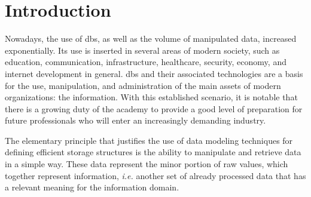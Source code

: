 \chapter{Introduction}
\label{chap:introduction}

Nowadays, the use of \acp{db}, as well as the volume of manipulated data, increased exponentially.
Its use is inserted in several areas of modern society, such as education, communication, infrastructure, healthcare, security, economy, and internet development in general.
\acp{db} and their associated technologies are a basis for the use, manipulation, and administration of the main assets of modern organizations: the information.
With this established scenario, it is notable that there is a growing duty of the academy to provide a good level of preparation for future professionals who will enter an increasingly demanding industry.

The elementary principle that justifies the use of data modeling techniques for defining efficient storage structures is the ability to manipulate and retrieve data in a simple way.
These data represent the minor portion of raw values, which together represent information, \textit{i.e.} another set of already processed data that has a relevant meaning for the information domain. %

